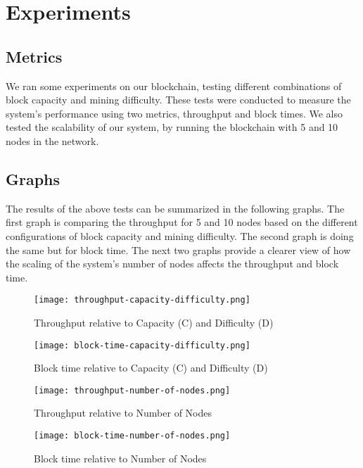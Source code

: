 \documentclass[conference]{IEEEtran}
\begin{document}
\section{\textbf{Experiments}}
\subsection{Metrics}
We ran some experiments on our blockchain, testing different combinations of block capacity and mining difficulty. These tests were conducted to measure the system's performance using two metrics, throughput and block times. We also tested the scalability of our system, by running the blockchain with 5 and 10 nodes in the network.

\subsection{Graphs}
The results of the above tests can be summarized in the following graphs. The first graph is comparing the throughput for 5 and 10 nodes based on the different configurations of block capacity and mining difficulty. The second graph is doing the same but for block time. The next two graphs provide a clearer view of how the scaling of the system's number of nodes affects the throughput and block time.

\begin{figure}[htbp]
\centerline{\texttt{[image: throughput-capacity-difficulty.png]}}
\caption{Throughput relative to Capacity (C) and Difficulty (D)}
\label{throughput-cd}
\end{figure}

\begin{figure}[htbp]
\centerline{\texttt{[image: block-time-capacity-difficulty.png]}}
\caption{Block time relative to Capacity (C) and Difficulty (D)}
\label{blocktime-cd}
\end{figure}

\begin{figure}[htbp]
\centerline{\texttt{[image: throughput-number-of-nodes.png]}}
\caption{Throughput relative to Number of Nodes}
\label{throughput-non}
\end{figure}

\begin{figure}[htbp]
\centerline{\texttt{[image: block-time-number-of-nodes.png]}}
\caption{Block time relative to Number of Nodes}
\label{blocktime-non}
\end{figure}
\end{document}
